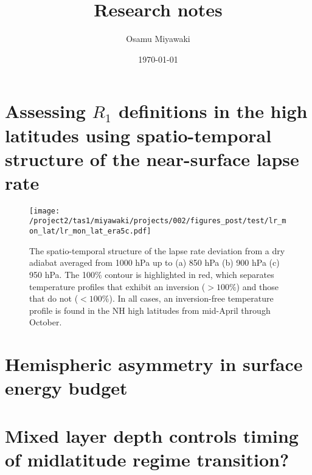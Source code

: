 \documentclass{article}
\title{Research notes}
\date{\today}
\author{Osamu Miyawaki}
\begin{document}
\maketitle

\section{Assessing $R_1$ definitions in the high latitudes using spatio-temporal structure of the near-surface lapse rate}

\begin{figure}
    \texttt{[image: /project2/tas1/miyawaki/projects/002/figures\_post/test/lr\_mon\_lat/lr\_mon\_lat\_era5c.pdf]}
    \caption{The spatio-temporal structure of the lapse rate deviation from a dry adiabat averaged from 1000 hPa up to (a) 850 hPa (b) 900 hPa (c) 950 hPa. The 100\% contour is highlighted in red, which separates temperature profiles that exhibit an inversion ($>100\%$) and those that do not ($<100\%$). In all cases, an inversion-free temperature profile is found in the NH high latitudes from mid-April through October.}
    \label{fig:dalr-mon-lat-era5c}
\end{figure}

\section{Hemispheric asymmetry in surface energy budget}

\section{Mixed layer depth controls timing of midlatitude regime transition?}



\end{document}
